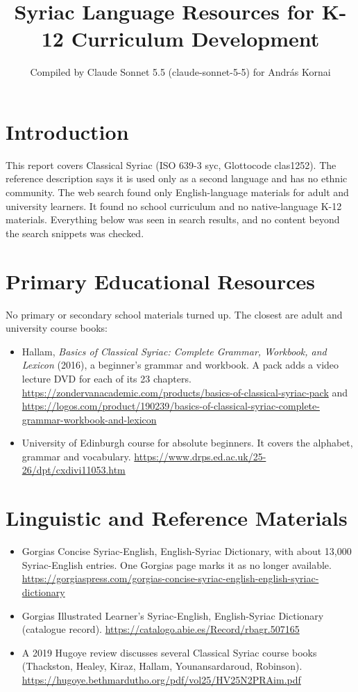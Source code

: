 \documentclass[12pt]{article}
\title{Syriac Language Resources for K-12 Curriculum Development}
\author{Compiled by Claude Sonnet 5.5 (claude-sonnet-5-5) for Andr\'as Kornai}
\date{}
\begin{document}
\maketitle

\section{Introduction}
This report covers Classical Syriac (ISO 639-3 syc, Glottocode clas1252). The reference description says it is used only as a second language and has no ethnic community. The web search found only English-language materials for adult and university learners. It found no school curriculum and no native-language K-12 materials. Everything below was seen in search results, and no content beyond the search snippets was checked.

\section{Primary Educational Resources}
No primary or secondary school materials turned up. The closest are adult and university course books:
\begin{itemize}
\item Hallam, \emph{Basics of Classical Syriac: Complete Grammar, Workbook, and Lexicon} (2016), a beginner's grammar and workbook. A pack adds a video lecture DVD for each of its 23 chapters. \url{https://zondervanacademic.com/products/basics-of-classical-syriac-pack} and \url{https://logos.com/product/190239/basics-of-classical-syriac-complete-grammar-workbook-and-lexicon}
\item University of Edinburgh course for absolute beginners. It covers the alphabet, grammar and vocabulary. \url{https://www.drps.ed.ac.uk/25-26/dpt/cxdivi11053.htm}
\end{itemize}

\section{Linguistic and Reference Materials}
\begin{itemize}
\item Gorgias Concise Syriac-English, English-Syriac Dictionary, with about 13,000 Syriac-English entries. One Gorgias page marks it as no longer available. \url{https://gorgiaspress.com/gorgias-concise-syriac-english-english-syriac-dictionary}
\item Gorgias Illustrated Learner's Syriac-English, English-Syriac Dictionary (catalogue record). \url{https://catalogo.abie.es/Record/rbagr.507165}
\item A 2019 Hugoye review discusses several Classical Syriac course books (Thackston, Healey, Kiraz, Hallam, Younansardaroud, Robinson). \url{https://hugoye.bethmardutho.org/pdf/vol25/HV25N2PRAim.pdf}
\end{itemize}
\end{document}

